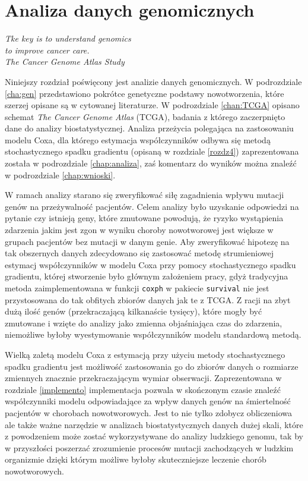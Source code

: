 \chapter{Analiza danych genomicznych}
\begin{flushright}
\textit{Tke key is to understand genomics \\
to improve cancer care. \\
The Cancer Genome Atlas Study
}
\end{flushright}

Niniejszy rozdział poświęcony jest analizie danych genomicznych. W podrozdziale \ref{cha:gen} przedstawiono pokrótce genetyczne podstawy nowotworzenia, które szerzej opisane są w cytowanej literaturze. W podrozdziale \ref{chan:TCGA} opisano schemat \textit{The Cancer Genome Atlas} (TCGA), badania z którego zaczerpnięto dane do analizy biostatystycznej. Analiza przeżycia polegająca na zastosowaniu modelu Coxa, dla którego estymacja współczynników odbywa się metodą stochastycznego spadku gradientu (opisaną w rozdziale \ref{rozdz4}) zaprezentowana została w podrozdziale \ref{chap:analiza}, zaś komentarz do wyników można znaleźć w podrozdziale \ref{chap:wnioski}. 

W ramach analizy starano się zweryfikować siłę zagadnienia wpływu mutacji genów na przeżywalność pacjentów. Celem analizy było uzyskanie odpowiedzi na pytanie czy istnieją geny, które zmutowane powodują, że ryzyko wystąpienia zdarzenia jakim jest zgon w wyniku choroby nowotworowej jest większe w grupach pacjentów bez mutacji w danym genie. Aby zweryfikować hipotezę na tak obszernych danych zdecydowano się zastosować metodę strumieniowej estymacj współczynników w modelu Coxa przy pomocy stochastycznego spadku gradientu, której stworzenie było głównym założeniem pracy, gdyż tradycyjna metoda zaimplementowana w funkcji \texttt{coxph} w pakiecie \texttt{survival} \cite{survival} nie jest przystosowana do tak obfitych zbiorów danych jak te z TCGA. Z racji na zbyt dużą ilość genów (przekraczającą kilkanaście tysięcy), które mogły być zmutowane i wzięte do analizy jako zmienna objaśniająca czas do zdarzenia, niemożliwe byłoby wyestymowanie współczynników modelu standardową metodą.

Wielką zaletą modelu Coxa z estymacją przy użyciu metody stochastycznego spadku gradientu jest możliwość zastosowania go do zbiorów danych o rozmiarze zmiennych znacznie przekraczającym wymiar obserwacji. Zaprezentowana w rozdziale \ref{implemento} implementacja pozwala w skończonym czasie znaleźć współczynniki modelu odpowiadające za wpływ danych genów na śmiertelność pacjentów w chorobach nowotworowych. Jest to nie tylko zdobycz obliczeniowa ale także ważne narzędzie w analizach biostatystycznych danych dużej skali, które z powodzeniem może zostać wykorzystywane do analizy ludzkiego genomu, tak by w przyszłości poszerzać zrozumienie procesów mutacji zachodzących w ludzkim organizmie dzięki którym możliwe byłoby skuteczniejsze leczenie chorób nowotworowych.
\newpage
